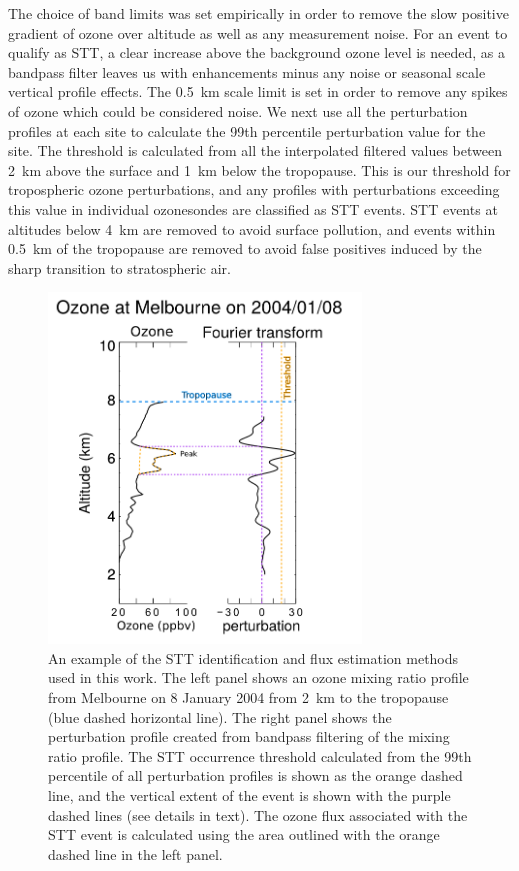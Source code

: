 \documentclass[acp, manuscript]{copernicus} %
\begin{document}
    The choice of band limits was set empirically in order to remove the slow positive gradient of ozone over altitude as well as any measurement noise.
    For an event to qualify as STT, a clear increase above the background ozone level is needed, as a bandpass filter leaves us with enhancements minus any noise or seasonal scale vertical profile effects.
    The 0.5~km scale limit is set in order to remove any spikes of ozone which could be considered noise.
    We next use all the perturbation profiles at each site to calculate the 99th percentile perturbation value for the site.
    The threshold is calculated from all the interpolated filtered values between 2~km above the surface and 1~km below the tropopause.
    This is our threshold for tropospheric ozone perturbations, and any profiles with perturbations exceeding this value in individual ozonesondes are classified as STT events.
    STT events at altitudes below 4~km are removed to avoid surface pollution, and events within 0.5~km of the tropopause are removed to avoid false positives induced by the sharp transition to stratospheric air.
    
    \begin{figure}[t]
      \includegraphics[width=8.3cm]{figures/filtereg.png}
      \caption{ %
	An example of the STT identification and flux estimation methods used in this work. 
	The left panel shows an ozone mixing ratio profile from Melbourne on 8 January 2004 from 2~km to the tropopause (blue dashed horizontal line).
	The right panel shows the perturbation profile created from bandpass filtering of the mixing ratio profile. The STT occurrence threshold calculated from the 99th percentile of all perturbation profiles is shown as the orange dashed line, and the vertical extent of the event is shown with the purple dashed lines (see details in text).
	The ozone flux associated with the STT event is calculated using the area outlined with the orange dashed line in the left panel.
      }
      \label{fig:filterEG}
    \end{figure}
   
\end{document}
